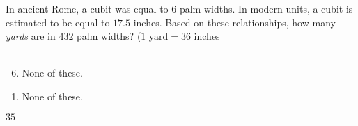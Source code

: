  
In ancient Rome, a cubit was equal to $6$ palm widths.  In modern units, a cubit is estimated to be equal to $17.5$ inches.  Based on these relationships, how many \textit{yards} are in $432$ palm widths? ($1$ yard$=36$ inches\\\\


\ifsat
	\begin{enumerate}[label=\Alph*)]
	\end{enumerate}
\else
\fi

\ifacteven
	\begin{enumerate}[label=\textbf{\Alph*.},itemsep=\fill,align=left]
		\setcounter{enumii}{5}
		\item None of these. 
	\end{enumerate}
\else
\fi

\ifactodd
	\begin{enumerate}[label=\textbf{\Alph*.},itemsep=\fill,align=left]
		\item None of these. 
	\end{enumerate}
\else
\fi

\ifgridin
$35$
\else
\fi

